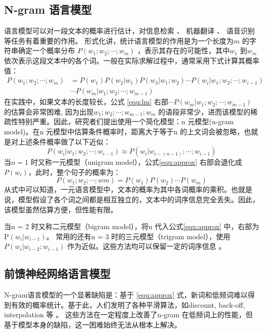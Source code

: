 \documentclass[12pt,a4paper]{article}
\begin{document}
\subsection{N-gram 语言模型}
语言模型可以对一段文本的概率进行估计，对信息检索 \cite{Jin:2002:TLM:564376.564386}、 机器翻译 \cite{DBLP:conf/naacl/BaltescuB15}、 语音识别 \cite{DBLP:conf/interspeech/SakSB14} 等任务有着重要的作用。
形式化讲，统计语言模型的作用是为一个长度为$m$ 的字符串确定一个概率分布 $P(w_1;w_2;\cdots;w_m)$ ，表示其存在的可能性，其中$w_1$ 到$w_m$ 依次表示这段文本中的各个词。一般在实际求解过程中，通常采用下式计算其概率值：
\begin{equation}
\label{equ:lm}
\begin{split}
P(w_1;w_2; \cdots;w_m) &= P(w_1) P(w_2|w_1) P(w_3|w_1;w_2)\cdots P(w_i | w_1;w_2;\cdots;w_{i-1}) \\
&\cdots P(w_m | w_1;w_2;\cdots;w_{m-1})
\end{split}
\end{equation}
在实践中，如果文本的长度较长，公式 \ref{equ:lm} 右部$\cdots P(w_m | w_1;w_2;\cdots;w_{m-1}) $  的估算会非常困难, 因为出现$w_1;w_2;\cdots;w_{m-1};w_{m}$ 的语段非常少，进而该模型的稀疏性特别严重。因此，研究者们提出使用一个简化模型：n 元模型(n-gram model)。在n 元模型中估算条件概率时，距离大于等于n 的上文词会被忽略，也就是对上述条件概率做了以下近似：
\begin{equation}
\label{equ:approx}
P(w_i | w_1;w_2;\cdots;w_{i-1})  \approx P(w_i | w_{i-(n-1)};\cdots;w_{i-1})
\end{equation}
当$n = 1$ 时又称一元模型（unigram model），公式\ref{equ:approx} 右部会退化成$P(w_i)$，此时，整个句子的概率为：
\begin{equation}
P(w_1;w_2; \cdots;wm) = P(w_1)P(w_2) \cdots P(w_m)
\end{equation}
从式中可以知道，一元语言模型中，文本的概率为其中各词概率的乘积。也就是说，模型假设了各个词之间都是相互独立的，文本中的词序信息完全丢失。因此，该模型虽然估算方便，但性能有限。

当n = 2 时又称二元模型（bigram model），将n 代入公式\ref{equ:approx} 中，右部为P$(w_i|w_{i-1})$。 常用的还有n = 3 时的三元模型（trigram model），使用$P(w_i |w_{i-2};w_{i-1})$ 作为近似。这些方法均可以保留一定的词序信息 \cite{DBLP:journals/csl/ChenG99}。

\subsection{前馈神经网络语言模型}
N-gram语言模型的一个显著缺陷是：基于 \ref{equ:approx} 式，新词和低频词难以得到有效的概率统计。基于此，人们发明了各种平滑算法，如discount, back-off, interpolation 等 \cite{DBLP:conf/interspeech/2009,DBLP:journals/csl/ZhouL99}。 这些方法在一定程度上改善了n-gram 在低频词上的性能，但基于模型本身的缺陷，这一困难始终无法从根本上解决。
\end{document}
